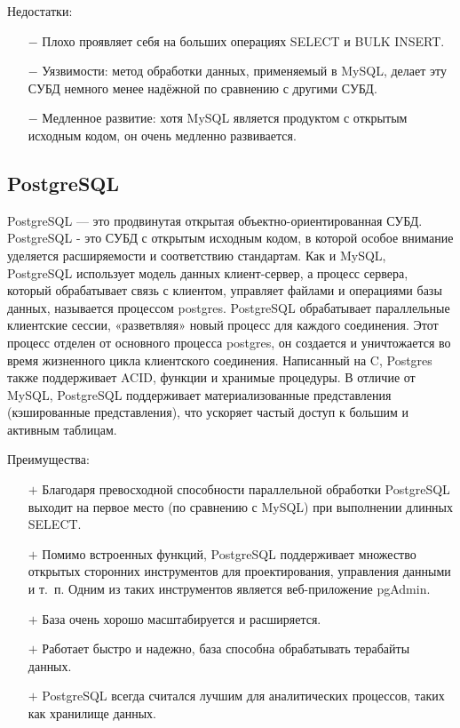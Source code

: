 \documentclass[12pt,a4paper,oneside]{report}
\begin{document}
Недостатки:
\begin{itemize}
	\item[$-$] Плохо проявляет себя на больших операциях SELECT и BULK INSERT.
	\item[$-$] Уязвимости: метод обработки данных, применяемый в MySQL, делает эту СУБД немного менее надёжной по сравнению с другими СУБД.
	\item[$-$] Медленное развитие: хотя MySQL является продуктом с открытым исходным кодом, он очень медленно развивается.
\end{itemize}

\subsection{PostgreSQL}
\quad PostgreSQL — это продвинутая открытая объектно-ориентированная СУБД.
PostgreSQL - это СУБД с открытым исходным кодом, в которой особое внимание уделяется расширяемости и соответствию стандартам. Как и MySQL, PostgreSQL использует модель данных клиент-сервер, а процесс сервера, который обрабатывает связь с клиентом, управляет файлами и операциями базы данных, называется процессом postgres.
PostgreSQL обрабатывает параллельные клиентские сессии, «разветвляя» новый процесс для каждого соединения. Этот процесс отделен от основного процесса postgres, он создается и уничтожается во время жизненного цикла клиентского соединения. Написанный на C, Postgres также поддерживает ACID, функции и хранимые процедуры. В отличие от MySQL, PostgreSQL поддерживает материализованные представления (кэшированные представления), что ускоряет частый доступ к большим и активным таблицам. \cite{sqlite}


Преимущества:
\begin{itemize}
	\item[$+$] Благодаря превосходной способности параллельной обработки PostgreSQL выходит на первое место (по сравнению с MySQL) при выполнении длинных SELECT. 
	\item[$+$] Помимо встроенных функций, PostgreSQL поддерживает множество открытых сторонних инструментов для проектирования, управления данными и т.~п.
	Одним из таких инструментов является веб-приложение pgAdmin.
	\item[$+$] База очень хорошо масштабируется и расширяется.
	\item[$+$] Работает быстро и надежно, база способна обрабатывать терабайты данных.
	\item[$+$] PostgreSQL всегда считался лучшим для аналитических процессов, таких как хранилище данных. 
\end{itemize}
\end{document}
